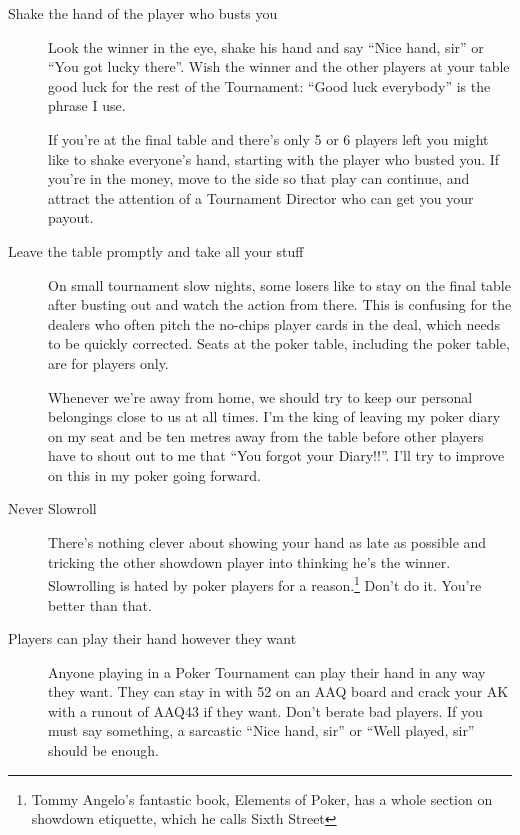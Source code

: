 \begin{description}

\item[Shake the hand of the player who busts you] Look the winner in the
eye, shake his hand and say ``Nice hand, sir'' or ``You got lucky there''.
Wish the winner and the other players at your table good luck for the
rest of the Tournament: ``Good luck everybody'' is the phrase I use.

If you're at the final table and there's only 5 or 6 players left you
might like to shake everyone's hand, starting with the player who
busted you. If you're in the money, move to the side so that play
can continue, and attract the attention of a Tournament Director who
can get you your payout.

\item[Leave the table promptly and take all your stuff] On small
tournament slow nights, some losers like to stay on the final table
after busting out and watch the action from there. This is confusing
for the dealers who often pitch the no-chips player cards in the deal,
which needs to be quickly corrected. Seats at the poker table,
including the poker table, are for players only.

Whenever we're away from home, we should try to keep our personal
belongings close to us at all times. I'm the king of leaving my poker
diary on my seat and be ten metres away from the table before other
players have to shout out to me that ``You forgot your Diary!!''. I'll
try to improve on this in my poker going forward.

\item[Never Slowroll]  There's nothing clever about showing your hand
as late as possible and tricking the other showdown player into thinking
he's the winner. Slowrolling is hated by poker players for a
reason.\footnote{Tommy Angelo's fantastic book, Elements of Poker, has
a whole section on showdown etiquette, which he calls Sixth Street}
Don't do it. You're better than that.


\item[Players can play their hand however they want] Anyone playing in
a Poker Tournament can play their hand in any way they want. They
can stay in with 52 on an AAQ board and crack your AK with a runout
of AAQ43 if they want. Don't berate bad players. If you must say
something, a sarcastic ``Nice hand, sir'' or ``Well played, sir'' should
be enough.


\end{description}
